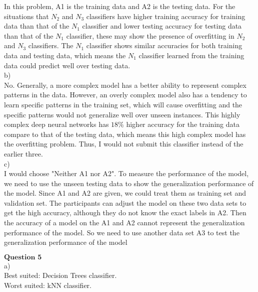\documentclass[12pt]{article}
\begin{document}
In this problem, A1 is the training data and A2 is the testing data. For the situations that $N_2$ and $N_3$ classifiers have higher training accuracy for training data than that of the $N_1$ classifier and lower testing accuracy for testing data than that of the $N_1$ classifier,  these may show the presence of overfitting in $N_2$ and $N_3$ classifiers. The $N_1$ classifier shows similar accuracies for both
training data and testing data, which means the $N_1$ classifier learned from the training data could predict well over testing data.\\
 
b)\\

No. Generally, a more complex model has a better ability to represent complex patterns in the data. However, an overly complex model also has a tendency to learn specific patterns in the training set, which will cause overfitting and the specific patterns would not generalize well over unseen instances. This highly complex deep neural networks has $18\%$ higher accuracy for the training data compare to that of the testing data, which means this high complex model has the overfitting problem. Thus, I would not submit this classifier instead of the earlier three. \\

c)\\

I would choose "Neither A1 nor A2". To measure the performance of the model, we need to use the unseen testing data to show the generalization performance of the model. Since A1 and A2 are given, we could treat them as training set and validation set. The participants can adjust the model on these two data sets to get the high accuracy, although they do not know the exact labels in A2. Then the accuracy of a model on the A1 and A2 cannot represent the 
generalization performance of the model. So we need to use another data set A3 to test the generalization performance of the model\\


\newpage

$\textbf{Question 5}$\\

a)\\

Best suited: Decision Trees classifier.\\

Worst suited: kNN classifier.\\
\end{document}
